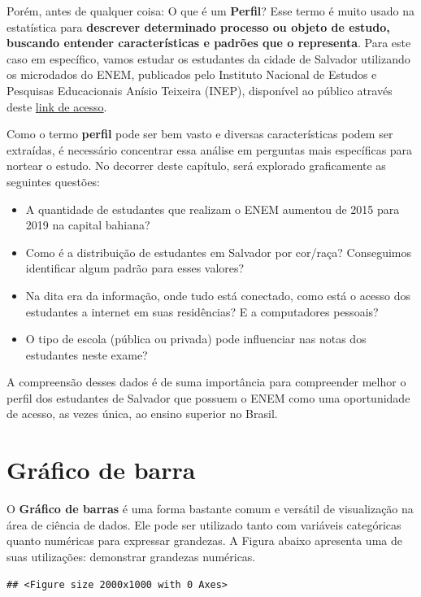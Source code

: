 \documentclass[
  oneside]{book}
\begin{document}
Porém, antes de qualquer coisa: O que é um \textbf{Perfil}? Esse termo é muito usado na estatística para \textbf{descrever determinado processo ou objeto de estudo, buscando entender características e padrões que o representa}. Para este caso em específico, vamos estudar os estudantes da cidade de Salvador utilizando os microdados do ENEM, publicados pelo Instituto Nacional de Estudos e Pesquisas Educacionais Anísio Teixeira (INEP), disponível ao público através deste \href{http://inep.gov.br/microdados}{link de acesso}.

Como o termo \textbf{perfil} pode ser bem vasto e diversas características podem ser extraídas, é necessário concentrar essa análise em perguntas mais específicas para nortear o estudo. No decorrer deste capítulo, será explorado graficamente as seguintes questões:

\begin{itemize}
\item
  A quantidade de estudantes que realizam o ENEM aumentou de 2015 para 2019 na capital bahiana?
\item
  Como é a distribuição de estudantes em Salvador por cor/raça? Conseguimos identificar algum padrão para esses valores?
\item
  Na dita era da informação, onde tudo está conectado, como está o acesso dos estudantes a internet em suas residências? E a computadores pessoais?
\item
  O tipo de escola (pública ou privada) pode influenciar nas notas dos estudantes neste exame?
\end{itemize}

A compreensão desses dados é de suma importância para compreender melhor o perfil dos estudantes de Salvador que possuem o ENEM como uma oportunidade de acesso, as vezes única, ao ensino superior no Brasil.

\hypertarget{gbarras}{%
\section{Gráfico de barra}\label{gbarras}}

O \textbf{Gráfico de barras} é uma forma bastante comum e versátil de visualização na área de ciência de dados. Ele pode ser utilizado tanto com variáveis categóricas quanto numéricas para expressar grandezas. A Figura abaixo apresenta uma de suas utilizações: demonstrar grandezas numéricas.

\begin{verbatim}
## <Figure size 2000x1000 with 0 Axes>
\end{verbatim}
\end{document}
